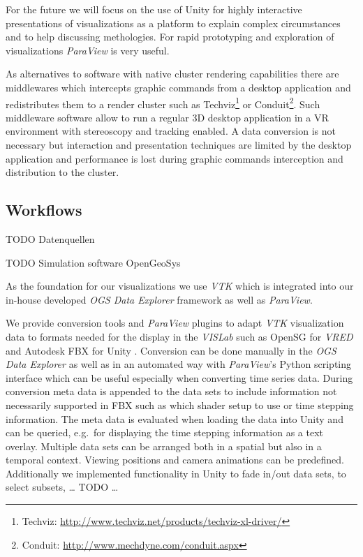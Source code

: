 For the future we will focus on the use of Unity for highly interactive presentations of visualizations as a platform to explain complex circumstances and to help discussing methologies. For rapid prototyping and exploration of visualizations \emph{ParaView} is very useful.

As alternatives to software with native cluster rendering capabilities there are middlewares which intercepts graphic commands from a desktop application and redistributes them to a render cluster such as Techviz\footnote{Techviz: \url{http://www.techviz.net/products/techviz-xl-driver/}} or Conduit\footnote{Conduit: \url{http://www.mechdyne.com/conduit.aspx}}. Such middleware software allow to run a regular 3D desktop application in a VR environment with stereoscopy and tracking enabled. A data conversion is not necessary but interaction and presentation techniques are limited by the desktop application and performance is lost during graphic commands interception and distribution to the cluster.

\subsection{Workflows}
\label{workflows}

TODO Datenquellen

TODO Simulation software OpenGeoSys \cite{kolditz:ogs}

As the foundation for our visualizations we use \emph{VTK} which is integrated into our in-house developed \emph{OGS Data Explorer} framework \cite{rink:eesenvirvis} as well as \emph{ParaView}.

We provide conversion tools and \emph{ParaView} plugins to adapt \emph{VTK} visualization data to formats needed for the display in the \emph{VISLab} such as OpenSG for \emph{VRED} \cite{bilke:vtkosgconverter} and Autodesk FBX for Unity \cite{bilke:vtkfbxconverter}. Conversion can be done manually in the \emph{OGS Data Explorer} as well as in an automated way with \emph{ParaView}'s Python scripting interface which can be useful especially when converting time series data. During conversion meta data is appended to the data sets to include information not necessarily supported in FBX such as which shader setup to use or time stepping information. The meta data is evaluated when loading the data into Unity and can be queried, e.g.~for displaying the time stepping information as a text overlay. Multiple data sets can be arranged both in a spatial but also in a temporal context. Viewing positions and camera animations can be predefined. Additionally we implemented functionality in Unity to fade in/out data sets, to select subsets, \ldots{} TODO \ldots{}

